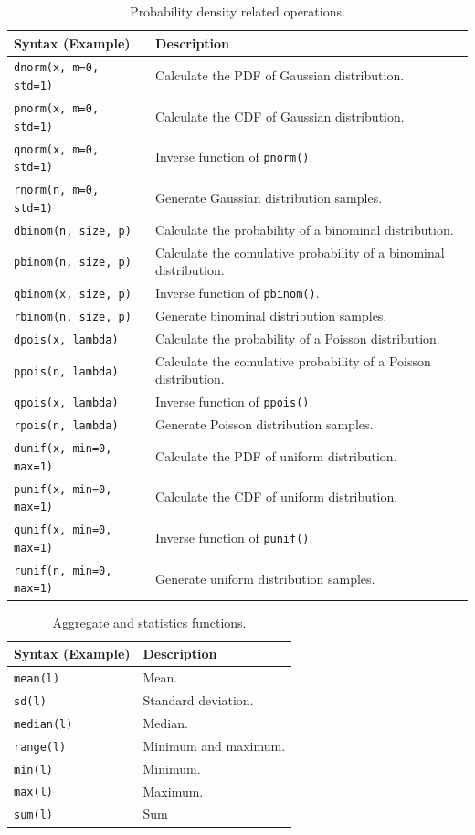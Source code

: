 \begin{table}
	\centering \caption{Probability density related operations.}\label{ch:r1:tab:probabilityfunction}
	\begin{tabularx}{\textwidth}{lX}
		\hline
		Syntax (Example) & Description \\ \hline
		\verb|dnorm(x, m=0, std=1)| & Calculate the PDF of Gaussian distribution. \\
		\verb|pnorm(x, m=0, std=1)| & Calculate the CDF of Gaussian distribution. \\
		\verb|qnorm(x, m=0, std=1)| & Inverse function of \verb|pnorm()|. \\
		\verb|rnorm(n, m=0, std=1)| & Generate Gaussian distribution samples. \\
		\verb|dbinom(n, size, p)| & Calculate the probability of a binominal distribution. \\
		\verb|pbinom(n, size, p)| & Calculate the comulative probability of a binominal distribution. \\
		\verb|qbinom(x, size, p)| & Inverse function of \verb|pbinom()|. \\
		\verb|rbinom(n, size, p)| & Generate binominal distribution samples. \\
		\verb|dpois(x, lambda)| & Calculate the probability of a Poisson distribution. \\
		\verb|ppois(n, lambda)| & Calculate the comulative probability of a Poisson distribution. \\
		\verb|qpois(x, lambda)| & Inverse function of \verb|ppois()|. \\
		\verb|rpois(n, lambda)| & Generate Poisson distribution samples. \\
		\verb|dunif(x, min=0, max=1)| & Calculate the PDF of uniform distribution. \\
		\verb|punif(x, min=0, max=1)| & Calculate the CDF of uniform distribution. \\
		\verb|qunif(x, min=0, max=1)| & Inverse function of \verb|punif()|. \\
		\verb|runif(n, min=0, max=1)| & Generate uniform distribution samples. \\
		\hline
	\end{tabularx}
\end{table}

\begin{table}
	\centering \caption{Aggregate and statistics functions.}\label{ch:r1:tab:statisticsfunction}
	\begin{tabularx}{\textwidth}{lX}
		\hline
		Syntax (Example) & Description \\ \hline
		\verb|mean(l)| & Mean. \\
		\verb|sd(l)| & Standard deviation. \\
		\verb|median(l)| & Median. \\
		\verb|range(l)| & Minimum and maximum. \\
		\verb|min(l)| & Minimum. \\
		\verb|max(l)| & Maximum. \\
		\verb|sum(l)| & Sum \\
		\hline
	\end{tabularx}
\end{table}

